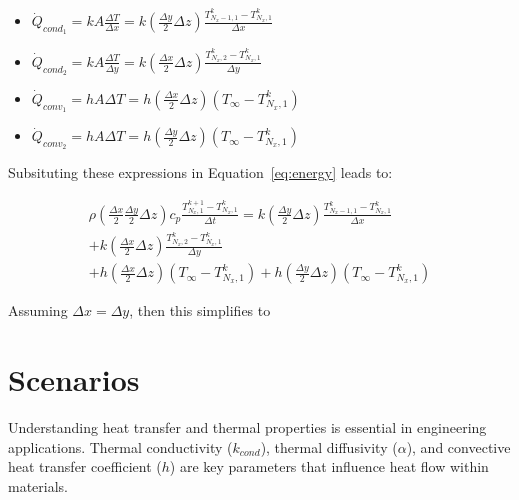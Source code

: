 \documentclass{article}
\newcommand{\ddfrac}[2]{\frac{\displaystyle #1}{\displaystyle #2}}
\begin{document}
\begin{itemize}
    \item $\dot{Q}_{cond_{1}} = kA\ddfrac{\Delta T}{\Delta x} = k(\ddfrac{\Delta y}{2} \Delta z) \ddfrac{T_{N_x-1,1}^k - T_{N_x,1}^k}{\Delta x}$
    \item $\dot{Q}_{cond_{2}} = kA\ddfrac{\Delta T}{\Delta y} = k(\ddfrac{\Delta x}{2} \Delta z) \ddfrac{T_{N_x,2}^k - T_{N_x,1}^k}{\Delta y}$
    \item $\dot{Q}_{conv_{1}} = hA\Delta T = h(\ddfrac{\Delta x}{2} \Delta z) \left(T_{\infty} - T_{N_x,1}^k\right)$
    \item $\dot{Q}_{conv_{2}} = hA\Delta T = h(\ddfrac{\Delta y}{2} \Delta z)\left(T_{\infty} - T_{N_x,1}^k\right)$
\end{itemize}

Subsituting these expressions in Equation~\eqref{eq:energy} leads to:

\begin{multline*}
    \rho\left(\ddfrac{\Delta x}{2} \ddfrac{\Delta y}{2} \Delta z\right) c_p \ddfrac{T_{N_x,1}^{k+1} - T_{N_x,1}^k}{\Delta t} = k(\ddfrac{\Delta y}{2} \Delta z) \ddfrac{T_{N_x-1,1}^k - T_{N_x,1}^k}{\Delta x} \\
    + k(\ddfrac{\Delta x}{2} \Delta z) \ddfrac{T_{N_x,2}^k - T_{N_x,1}^k}{\Delta y} \\
    + h(\ddfrac{\Delta x}{2} \Delta z) \left(T_{\infty} - T_{N_x,1}^k\right)
    + h(\ddfrac{\Delta y}{2} \Delta z)\left(T_{\infty} - T_{N_x,1}^k\right)
\end{multline*}

Assuming $\Delta x = \Delta y$, then this simplifies to 
\begin{center}
    \noindent {}        
\end{center}

\pagebreak

\section{Scenarios}


Understanding heat transfer and thermal properties is essential in engineering applications. Thermal conductivity ($k_{cond}$), thermal diffusivity ($\alpha$), and convective heat transfer coefficient ($h$) are key parameters that influence heat flow within materials. \\
\end{document}
